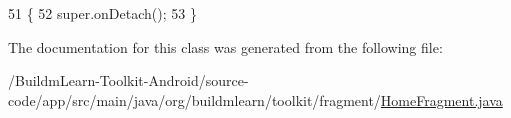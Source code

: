 \begin{DoxyCode}
51                            \{
52         super.onDetach();
53     \}
\end{DoxyCode}


The documentation for this class was generated from the following file\-:\begin{DoxyCompactItemize}
\item 
/\-Buildm\-Learn-\/\-Toolkit-\/\-Android/source-\/code/app/src/main/java/org/buildmlearn/toolkit/fragment/\hyperlink{HomeFragment_8java}{Home\-Fragment.\-java}\end{DoxyCompactItemize}
